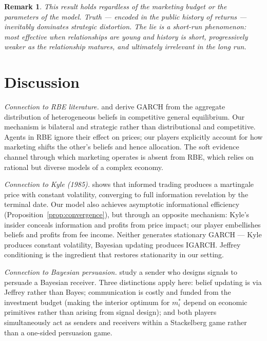 \documentclass[12pt,a4paper]{article}
\newtheorem{remark}{Remark}
\newcommand{\1}{\mathbf{1}}
\begin{document}
\begin{remark}
This result holds regardless of the marketing budget or the
parameters of the model. Truth --- encoded in the public history of
returns --- inevitably dominates strategic distortion. The lie is
a short-run phenomenon: most effective when relationships are young
and history is short, progressively weaker as the relationship
matures, and ultimately irrelevant in the long run.
\end{remark}

\section{Discussion}
\label{sec:discussion}

\textit{Connection to RBE literature.}
\citet{Kurz1994} and \citet{KurzMotolese2001} derive GARCH from
the aggregate distribution of heterogeneous beliefs in competitive
general equilibrium. Our mechanism is bilateral and strategic rather
than distributional and competitive. Agents in RBE ignore their
effect on prices; our players explicitly account for how marketing
shifts the other's beliefs and hence allocation. The soft evidence
channel through which marketing operates is absent from RBE, which
relies on rational but diverse models of a complex economy.

\textit{Connection to Kyle (1985).}
\citet{Kyle1985} shows that informed trading produces a martingale
price with constant volatility, converging to full information
revelation by the terminal date. Our model also achieves asymptotic
informational efficiency (Proposition~\ref{prop:convergence}),
but through an opposite mechanism: Kyle's insider conceals
information and profits from price impact; our player embellishes
beliefs and profits from fee income. Neither generates stationary
GARCH --- Kyle produces constant volatility, Bayesian updating
produces IGARCH. Jeffrey conditioning is the ingredient that
restores stationarity in our setting.

\textit{Connection to Bayesian persuasion.}
\citet{KamenicaGentzkow2011} study a sender who designs signals
to persuade a Bayesian receiver. Three distinctions apply here:
belief updating is via Jeffrey rather than Bayes; communication
is costly and funded from the investment budget (making the
interior optimum for $m_i^*$ depend on economic primitives
rather than arising from signal design); and both players
simultaneously act as senders and receivers within a Stackelberg
game rather than a one-sided persuasion game.
\end{document}
